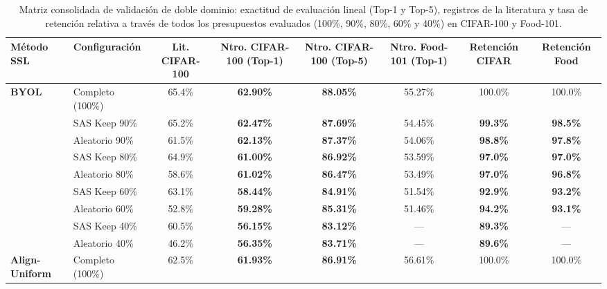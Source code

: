 \begin{table}[t]
\centering
\caption{Matriz consolidada de validación de doble dominio: exactitud de evaluación lineal (Top-1 y Top-5), registros de la literatura y tasa de retención relativa a través de todos los presupuestos evaluados (100\%, 90\%, 80\%, 60\% y 40\%) en CIFAR-100 y Food-101.}
\label{tab:cross_domain}
\begin{tabular}{llcccccc}
\toprule
\textbf{Método SSL} & \textbf{Configuración} & \textbf{Lit. CIFAR-100} & \textbf{Ntro. CIFAR-100 (Top-1)} & \textbf{Ntro. CIFAR-100 (Top-5)} & \textbf{Ntro. Food-101 (Top-1)} & \textbf{Retención CIFAR} & \textbf{Retención Food} \\
\midrule
\textbf{BYOL}        & Completo (100\%)  & 65.4\% \cite{joshi2023sas, grill2020byol} & \textbf{62.90\%} & \textbf{88.05\%} & 55.27\% & 100.0\% & 100.0\% \\
                     & SAS Keep 90\%     & 65.2\% \cite{joshi2023sas}                & \textbf{62.47\%} & \textbf{87.69\%} & 54.45\% & \textbf{99.3\%} & \textbf{98.5\%} \\
                     & Aleatorio 90\%    & 61.5\% \cite{joshi2023sas}                & \textbf{62.13\%} & \textbf{87.37\%} & 54.06\% & \textbf{98.8\%} & \textbf{97.8\%} \\
                     & SAS Keep 80\%     & 64.9\% \cite{joshi2023sas}                & \textbf{61.00\%} & \textbf{86.92\%} & 53.59\% & \textbf{97.0\%} & \textbf{97.0\%} \\
                     & Aleatorio 80\%    & 58.6\% \cite{joshi2023sas}                & \textbf{61.02\%} & \textbf{86.47\%} & 53.49\% & \textbf{97.0\%} & \textbf{96.8\%} \\
                     & SAS Keep 60\%     & 63.1\% \cite{joshi2023sas}                & \textbf{58.44\%} & \textbf{84.91\%} & 51.54\% & \textbf{92.9\%} & \textbf{93.2\%} \\
                     & Aleatorio 60\%    & 52.8\% \cite{joshi2023sas}                & \textbf{59.28\%} & \textbf{85.31\%} & 51.46\% & \textbf{94.2\%} & \textbf{93.1\%} \\
                     & SAS Keep 40\%     & 60.5\% \cite{joshi2023sas}                & \textbf{56.15\%} & \textbf{83.12\%} & ---     & \textbf{89.3\%} & --- \\
                     & Aleatorio 40\%    & 46.2\% \cite{joshi2023sas}                & \textbf{56.35\%} & \textbf{83.71\%} & ---     & \textbf{89.6\%} & --- \\
\midrule
\textbf{Align-Uniform} & Completo (100\%) & 62.5\% \cite{wang2020alignuniform}       & \textbf{61.93\%} & \textbf{86.91\%} & 56.61\% & 100.0\% & 100.0\% \\

\end{tabular}
\end{table}
